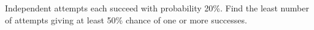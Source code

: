 Independent attempts each succeed with probability 20\%. Find the least number of attempts giving at least 50\% chance of one or more successes.
